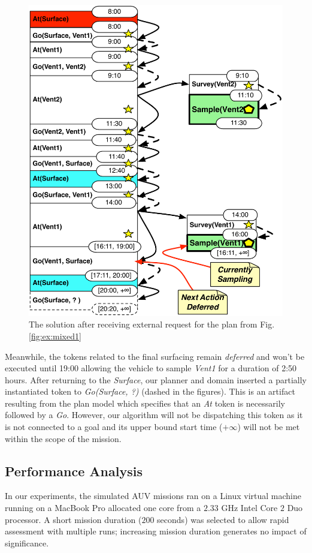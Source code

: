 \begin{figure}[t]
  \centering
  \includegraphics[width=0.8\columnwidth]{figs/example_MixedUpdate}
  \vskip-3mm
  \caption{\small The solution after receiving external request for
    the plan from Fig. \ref{fig:ex:mixed1}}
  \label{fig:ex:mixed2}
  \vskip-3mm
\end{figure}

Meanwhile, the tokens related to the final surfacing remain {\em
  deferred} and won't be executed until 19:00 allowing the vehicle to
sample {\em Vent1} for a duration of 2:50 hours.  After returning to
the {\em Surface}, our planner and domain inserted a partially
instantiated token to {\em Go(Surface, ?)} (dashed in the figures).
This is an artifact resulting from the plan model which specifies that
an {\em At} token is necessarily followed by a {\em Go}.  However, our
algorithm will not be dispatching this token as it is not connected to
a goal and its upper bound start time ($+\infty$) will
not be met within the scope of the mission.

\subsection{Performance Analysis}

In our experiments, the simulated AUV missions ran on a Linux virtual
machine running on a MacBook Pro allocated one core from a $2.33$ GHz
Intel Core $2$ Duo processor.
A short mission duration ($200$ seconds) was selected to allow rapid
assessment with multiple runs; increasing mission duration generates
no impact of significance.
 
